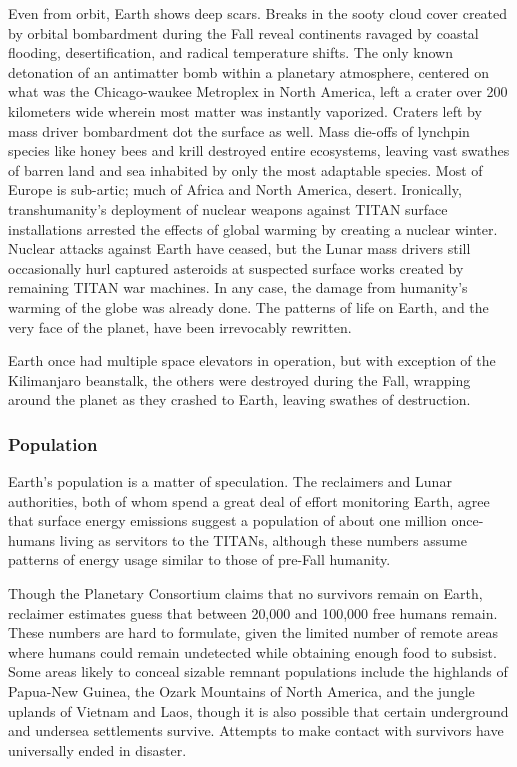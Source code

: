 Even from orbit, Earth shows deep scars. Breaks in the sooty cloud cover created by orbital bombardment during the Fall reveal continents ravaged by coastal flooding, desertification, and radical temperature shifts. The only known detonation of an antimatter bomb within a planetary atmosphere, centered on what was the Chicago-waukee Metroplex in North America, left a crater over 200 kilometers wide wherein most matter was instantly vaporized. Craters left by mass driver bombardment dot the surface as well. Mass die-offs of lynchpin species like honey bees and krill destroyed entire ecosystems, leaving vast swathes of barren land and sea inhabited by only the most adaptable species. Most of Europe is sub-artic; much of Africa and North America, desert. Ironically, transhumanity's deployment of nuclear weapons against TITAN surface installations arrested the effects of global warming by creating a nuclear winter. Nuclear attacks against Earth have ceased, but the Lunar mass drivers still occasionally hurl captured asteroids at suspected surface works created by remaining TITAN war machines. In any case, the damage from humanity's warming of the globe was already done. The patterns of life on Earth, and the very face of the planet, have been irrevocably rewritten. 

Earth once had multiple space elevators in operation, but with exception of the Kilimanjaro beanstalk, the others were destroyed during the Fall, wrapping around the planet as they crashed to Earth, leaving swathes of destruction. 

\subsubsection{Population} \label{sec:population} 

Earth's population is a matter of speculation. The reclaimers and Lunar authorities, both of whom spend a great deal of effort monitoring Earth, agree that surface energy emissions suggest a population of about one million once-humans living as servitors to the TITANs, although these numbers assume patterns of energy usage similar to those of pre-Fall humanity. 

Though the Planetary Consortium claims that no survivors remain on Earth, reclaimer estimates guess that between 20,000 and 100,000 free humans remain. These numbers are hard to formulate, given the limited number of remote areas where humans could remain undetected while obtaining enough food to subsist. Some areas likely to conceal sizable remnant populations include the highlands of Papua-New Guinea, the Ozark Mountains of North America, and the jungle uplands of Vietnam and Laos, though it is also possible that certain underground and undersea settlements survive. Attempts to make contact with survivors have universally ended in disaster. 

